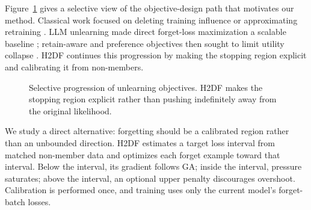 \documentclass[10pt,twocolumn]{article}
\newcommand{\method}{\textsc{H2DF}}
\begin{document}
Figure~\ref{fig:history} gives a selective view of the objective-design path
that motivates our method. Classical work focused on deleting training influence
or approximating retraining \citep{cao2015towards,ginart2019making,
bourtoule2021machine}. LLM unlearning made direct forget-loss maximization a
scalable baseline \citep{yao2023large}; retain-aware and preference objectives
then sought to limit utility collapse \citep{chen2023unlearn,
zhang2024negative,fan2024simplicity}. \method{} continues this progression by
making the stopping region explicit and calibrating it from non-members.

\begin{figure}[t]
\centering
{}
\caption{Selective progression of unlearning objectives. \method{} makes the
stopping region explicit rather than pushing indefinitely away from the
original likelihood.}
\label{fig:history}
\end{figure}

We study a direct alternative: forgetting should be a calibrated region rather
than an unbounded direction. \method{} estimates a target loss interval from
matched non-member data and optimizes each forget example toward that interval.
Below the interval, its gradient follows GA; inside the interval, pressure
saturates; above the interval, an optional upper penalty discourages overshoot.
Calibration is performed once, and training uses only the current model's
forget-batch losses.
\end{document}
